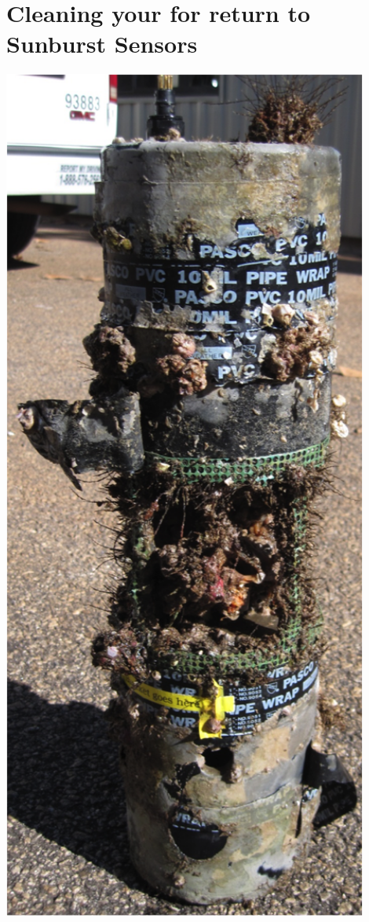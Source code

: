 \section*{Cleaning your \instType{} for return to Sunburst Sensors}
\label{sec:Cleaning}

\ifcase \inst	%
    \noindent
    \begin{minipage}[t]{0.5\textwidth}
    \centering
    \raisebox{\dimexpr \topskip-\height}
    {
       \includegraphics[width=0.9\textwidth]{figs/Foul.png}
    }
    \end{minipage}
